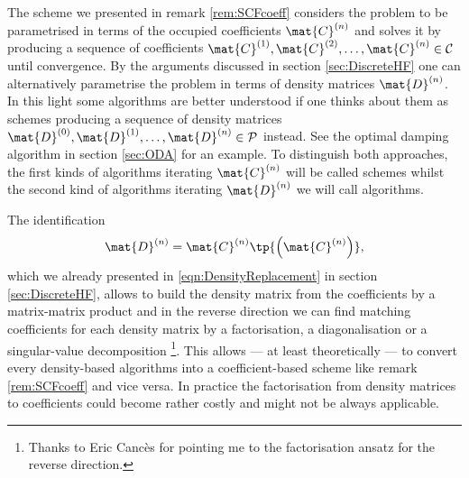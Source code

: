 The scheme we presented in remark \ref{rem:SCFcoeff}
considers the \HF problem to be parametrised
in terms of the occupied coefficients $\mat{C}^{(n)}$
and solves it by producing a sequence of coefficients
$\mat{C}^{(1)}, \mat{C}^{(2)}, \ldots, \mat{C}^{(n)} \in \mathcal{C}$
until convergence.
By the arguments discussed in section \ref{sec:DiscreteHF}
one can alternatively parametrise the \HF problem in terms of
density matrices $\mat{D}^{(n)}$.
In this light some \SCF algorithms are better understood
if one thinks about them as schemes producing
a sequence of density matrices
$\mat{D}^{(0)}, \mat{D}^{(1)}, \ldots, \mat{D}^{(n)} \in \mathcal{P}$
instead.
See the optimal damping algorithm in section \vref{sec:ODA} for an example.
To distinguish both approaches,
the first kinds of algorithms iterating $\mat{C}^{(n)}$
will be called  schemes
whilst the second kind of algorithms iterating $\mat{D}^{(n)}$
we will call  algorithms.

\noindent
The identification
\[ \mat{D}^{(n)} = \mat{C}^{(n)} \tp{\left(\mat{C}^{(n)}\right)}, \]
which we already presented in \eqref{eqn:DensityReplacement} in section \ref{sec:DiscreteHF},
allows to build the density matrix from the coefficients by a matrix-matrix product
and in the reverse direction we can find matching coefficients for each density
matrix by a factorisation,
\eg a diagonalisation or a singular-value decomposition%
\footnote{Thanks to Eric Cancès for pointing me to the factorisation ansatz
for the reverse direction.}.
This allows --- at least theoretically --- to convert
every density-based algorithms
into a coefficient-based scheme like remark \ref{rem:SCFcoeff}
and vice versa.
In practice the factorisation from density matrices to coefficients
could become rather costly and might not be always applicable.
